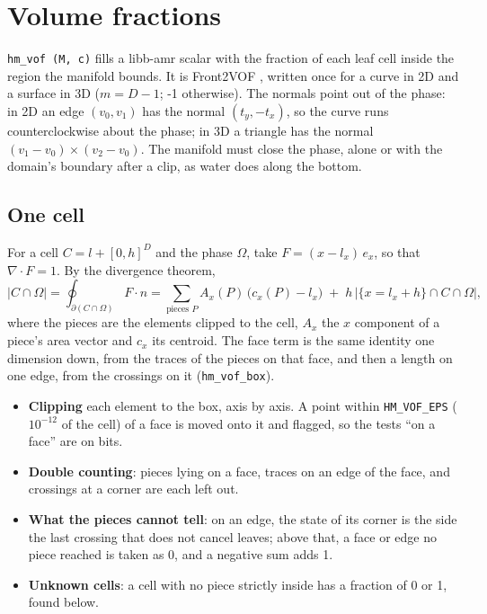 \documentclass[10pt,a4paper]{article}
\theoremstyle{definition}
\newcommand{\fn}[1]{\texttt{#1}}
\begin{document}
\section{Volume fractions}
\label{sec:vof}

\fn{hm\_vof (M, c)} fills a libb-amr scalar with the fraction of each leaf
cell inside the region the manifold bounds. It is Front2VOF
\cite{front2vof}, written once for a curve in 2D and a surface in 3D
($m = D - 1$; -1 otherwise). The normals point out of the phase: in 2D an
edge $(v_0, v_1)$ has the normal $(t_y, -t_x)$, so the curve runs
counterclockwise about the phase; in 3D a triangle has the normal $(v_1 -
v_0) \times (v_2 - v_0)$. The manifold must close the phase, alone or with
the domain's boundary after a clip, as water does along the bottom.

\subsection{One cell}

For a cell $C = l + [0, h]^D$ and the phase $\Omega$, take $F = (x - l_x)\,
e_x$, so that $\nabla \cdot F = 1$. By the divergence theorem,
\[
  |C \cap \Omega| = \oint_{\partial (C \cap \Omega)} F \cdot n
    = \sum_{\text{pieces } P} A_x(P)\, \big( c_x(P) - l_x \big)
      \;+\; h \, \big| \{ x = l_x + h \} \cap C \cap \Omega \big|,
\]
where the pieces are the elements clipped to the cell, $A_x$ the
$x$ component of a piece's area vector and $c_x$ its centroid. The face
term is the same identity one dimension down, from the traces of the
pieces on that face, and then a length on one edge, from the crossings on
it (\fn{hm\_vof\_box}).
\begin{itemize}
  \item \textbf{Clipping} each element to the box, axis by axis. A point
    within \fn{HM\_VOF\_EPS} ($10^{-12}$ of the cell) of a face is moved
    onto it and flagged, so the tests ``on a face'' are on bits.
  \item \textbf{Double counting}: pieces lying on a face, traces on an edge
    of the face, and crossings at a corner are each left out.
  \item \textbf{What the pieces cannot tell}: on an edge, the state of its
    corner is the side the last crossing that does not cancel leaves; above
    that, a face or edge no piece reached is taken as 0, and a negative sum
    adds 1.
  \item \textbf{Unknown cells}: a cell with no piece strictly inside has a
    fraction of 0 or 1, found below.
\end{itemize}
\end{document}
